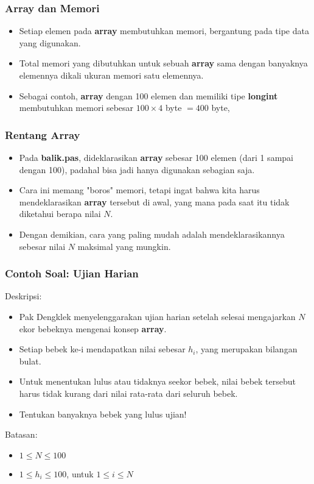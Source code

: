 \documentclass{beamer}
\begin{document}
\begin{frame}
\frametitle{Array dan Memori}
\begin{itemize}
	\item Setiap elemen pada \textbf{array} membutuhkan memori, bergantung pada tipe data yang digunakan.
	\item Total memori yang dibutuhkan untuk sebuah \textbf{array} sama dengan banyaknya elemennya dikali ukuran memori satu elemennya.
	\item Sebagai contoh, \textbf{array} dengan 100 elemen dan memiliki tipe \textbf{longint} membutuhkan memori sebesar $100 \times 4$ byte $= 400$ byte, 
\end{itemize}
\end{frame}

\begin{frame}
\frametitle{Rentang Array}
\begin{itemize}
	\item Pada \textbf{balik.pas}, dideklarasikan \textbf{array} sebesar 100 elemen (dari 1 sampai dengan 100), padahal bisa jadi hanya digunakan sebagian saja.
	\item Cara ini memang "boros" memori, tetapi ingat bahwa kita harus mendeklarasikan \textbf{array} tersebut di awal, yang mana pada saat itu tidak diketahui berapa nilai $N$.
	\item Dengan demikian, cara yang paling mudah adalah mendeklarasikannya sebesar nilai $N$ maksimal yang mungkin.
\end{itemize}
\end{frame}

\begin{frame}
\frametitle{Contoh Soal: Ujian Harian}
Deskripsi:
\begin{itemize}
	\item Pak Dengklek menyelenggarakan ujian harian setelah selesai mengajarkan $N$ ekor bebeknya mengenai konsep \textbf{array}.
	\item Setiap bebek ke-i mendapatkan nilai sebesar \textbf{$h_i$}, yang merupakan bilangan bulat.
	\item Untuk menentukan lulus atau tidaknya seekor bebek, nilai bebek tersebut harus tidak kurang dari nilai rata-rata dari seluruh bebek.
	\item Tentukan banyaknya bebek yang lulus ujian!
\end{itemize}
Batasan:
\begin{itemize}
	\item $1 \le N \le 100$
	\item $1 \le h_i \le 100$, untuk $1 \le i \le N$
\end{itemize}
\end{frame}
\end{document}
